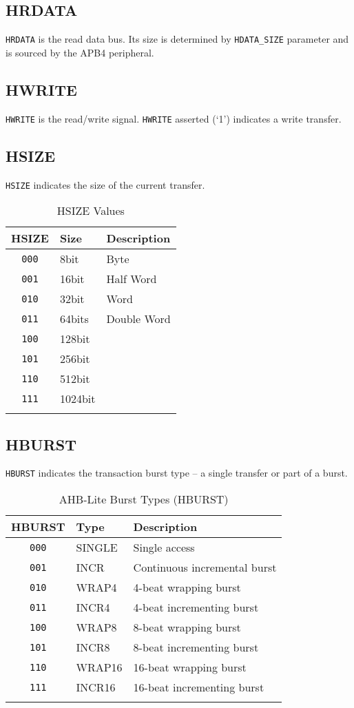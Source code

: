 \subsection{HRDATA}\label{hrdata}

\texttt{HRDATA} is the read data bus. Its size is determined by \texttt{HDATA\_SIZE}
parameter and is sourced by the APB4 peripheral.

\subsection{HWRITE}\label{hwrite}

\texttt{HWRITE} is the read/write signal. \texttt{HWRITE} asserted (`1') indicates a write
transfer.

\subsection{HSIZE}\label{hsize}

\texttt{HSIZE} indicates the size of the current transfer.

\begin{longtable}[]{@{}cll@{}}
	\toprule
	HSIZE & Size & Description\tabularnewline
	\midrule
	\endhead
	\texttt{000} & 8bit & Byte\tabularnewline
	\texttt{001} & 16bit & Half Word\tabularnewline
	\texttt{010} & 32bit & Word\tabularnewline
	\texttt{011} & 64bits & Double Word\tabularnewline
	\texttt{100} & 128bit &\tabularnewline
	\texttt{101} & 256bit &\tabularnewline
	\texttt{110} & 512bit &\tabularnewline
	\texttt{111} & 1024bit &\tabularnewline
	\bottomrule
	\caption{HSIZE Values}
\end{longtable}

\subsection{HBURST}\label{hburst}

\texttt{HBURST} indicates the transaction burst type -- a single transfer or part
of a burst.

\begin{longtable}[]{@{}cll@{}}
	\toprule
		HBURST & Type & Description\tabularnewline
	\midrule
	\endhead
		\texttt{000} & SINGLE & Single access\tabularnewline
		\texttt{001} & INCR   & Continuous incremental burst\tabularnewline
		\texttt{010} & WRAP4  & 4-beat wrapping burst\tabularnewline
		\texttt{011} & INCR4  & 4-beat incrementing burst\tabularnewline
		\texttt{100} & WRAP8  & 8-beat wrapping burst\tabularnewline
		\texttt{101} & INCR8  & 8-beat incrementing burst\tabularnewline
		\texttt{110} & WRAP16 & 16-beat wrapping burst\tabularnewline
		\texttt{111} & INCR16 & 16-beat incrementing burst\tabularnewline
	\bottomrule
	\caption{AHB-Lite Burst Types (HBURST)}
\end{longtable}

